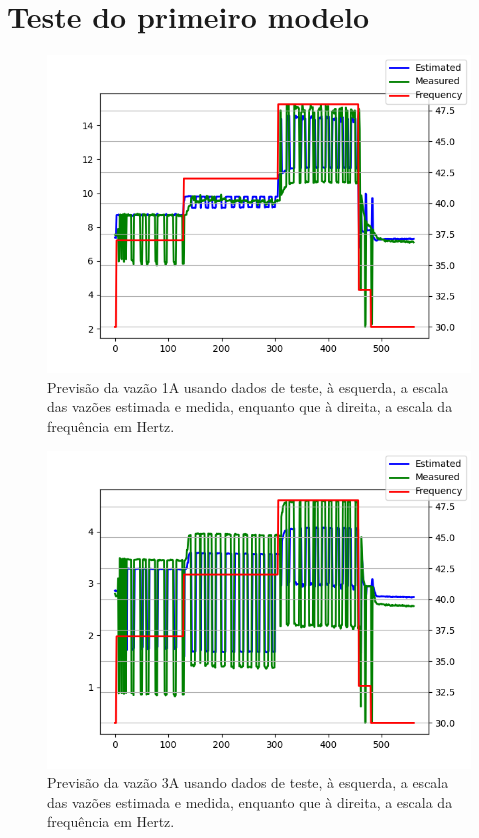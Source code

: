 \documentclass[12pt]{article}
\begin{document}
\section{Teste do primeiro modelo}



\begin{figure}
    \centering
    \includegraphics{results/initial-test-1A.png}
    \caption{Previsão da vazão 1A usando dados de teste, à esquerda, a escala das vazões estimada e medida, enquanto que à direita, a escala da frequência em Hertz.}
    \label{fig:initial-test-1A}
\end{figure}

\begin{figure}
    \centering
    \includegraphics{results/initial-test-3A.png}
    \caption{Previsão da vazão 3A usando dados de teste, à esquerda, a escala das vazões estimada e medida, enquanto que à direita, a escala da frequência em Hertz.}
    \label{fig:initial-test-3A}
\end{figure}
\end{document}
